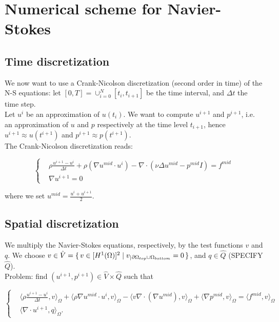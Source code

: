 \documentclass[11pt,a4paper,titlepage]{report}
\begin{document}
\section{Numerical scheme for Navier-Stokes}

\subsection{Time discretization}
We now want to use a Crank-Nicolson discretization (second order in time) of the N-S equations: let $[0, T] = \cup^N_{i=0} [t_i, t_{i+1}] $ be the time interval, and $\Delta t$ the time step. \\
Let $u^i$ be an approximation of $u(t_i)$. We want to compute $u^{i+1}$ and $p^{i+1}$, i.e. an approximation of $u$ and $p$ respectively at the time level $t_{i+1}$, hence $u^{i+1} \approx u(t^{i+1})$ and $p^{i+1} \approx p(t^{i+1})$. \\
The Crank-Nicolson discretization reads:

\[
\left\{
\begin{aligned}
& \rho \frac{u^{i+1} - u^i}{\Delta t} + \rho (\nabla u^{mid} \cdot u^i) - \nabla \cdot (\nu \Delta u^{mid} - p^{mid}I) = f^{mid} \\
& \nabla u^{i+1} = 0
\end{aligned}
\right.
\]

where we set $u^{mid} = \frac{u^i + u^{i+1}}{2}$.

\subsection{Spatial discretization}
We multiply the Navier-Stokes equations, respectively, by the test functions $v$ and $q$. We choose $v \in \hat{V} = \set{v \in [H^1(\Omega)]^2 | v_|{_{\partial \Omega_{top} \cup \Omega_{bottom}}} = 0}$, and $q \in \hat{Q}$ (SPECIFY $\hat{Q}$). \\
Problem: find $(u^{i+1}, p^{i+1}) \in \hat{V} \times \hat{Q}$ such that

\[
\left\{
\begin{aligned}
& \langle \rho \frac{u^{i+1} - u^i}{\Delta t},v \rangle_\Omega
+ \langle \rho \nabla u^{mid} \cdot u^i  ,v \rangle_\Omega
- \langle v \nabla \cdot (\nabla u^{mid}) ,v \rangle_\Omega
+ \langle \nabla p^{mid} ,v \rangle_\Omega = \langle f^{mid} ,v \rangle_\Omega \\
& \langle \nabla \cdot u^{i+1},q \rangle_\Omega.
\end{aligned}
\right.
\]
\end{document}
